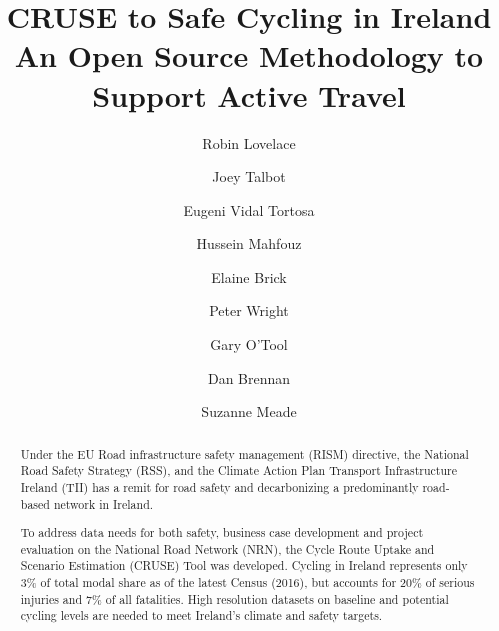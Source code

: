 \documentclass[
  super,
  preprint,
  3p]{elsarticle}
\begin{document}
\begin{frontmatter}
\title{CRUSE to Safe Cycling in Ireland \\\large{An Open Source
Methodology to Support Active Travel} }
\author[1]{Robin Lovelace%
%
}
\author[1]{Joey Talbot%
%
}

\author[1]{Eugeni Vidal Tortosa%
%
}

\author[1]{Hussein Mahfouz%
%
}

\author[2]{Elaine Brick%
%
}

\author[3]{Peter Wright%
%
}

\author[2]{Gary O'Tool%
%
}

\author[4]{Dan Brennan%
%
}

\author[4]{Suzanne Meade%
%
}












        
\begin{abstract}
Under the EU Road infrastructure safety management (RISM) directive, the
National Road Safety Strategy (RSS), and the Climate Action Plan
Transport Infrastructure Ireland (TII) has a remit for road safety and
decarbonizing a predominantly road-based network in Ireland.

To address data needs for both safety, business case development and
project evaluation on the National Road Network (NRN), the Cycle Route
Uptake and Scenario Estimation (CRUSE) Tool was developed. Cycling in
Ireland represents only 3\% of total modal share as of the latest Census
(2016), but accounts for 20\% of serious injuries and 7\% of all
fatalities. High resolution datasets on baseline and potential cycling
levels are needed to meet Ireland's climate and safety targets.


\end{abstract}
\end{frontmatter}
\end{document}
